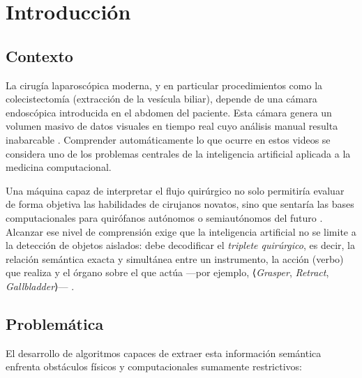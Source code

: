\documentclass[11pt]{article}
\begin{document}
\section{Introducción}
\label{sec:intro}

\subsection{Contexto}
\label{sec:contexto}

La cirugía laparoscópica moderna, y en particular procedimientos como la colecistectomía (extracción de la vesícula biliar), depende de una cámara endoscópica introducida en el abdomen del paciente. Esta cámara genera un volumen masivo de datos visuales en tiempo real cuyo análisis manual resulta inabarcable \cite{dergachyova2016}. Comprender automáticamente lo que ocurre en estos videos se considera uno de los problemas centrales de la inteligencia artificial aplicada a la medicina computacional.

Una máquina capaz de interpretar el flujo quirúrgico no solo permitiría evaluar de forma objetiva las habilidades de cirujanos novatos, sino que sentaría las bases computacionales para quirófanos autónomos o semiautónomos del futuro \cite{twinanda2017}. Alcanzar ese nivel de comprensión exige que la inteligencia artificial no se limite a la detección de objetos aislados: debe decodificar el \emph{triplete quirúrgico}, es decir, la relación semántica exacta y simultánea entre un instrumento, la acción (verbo) que realiza y el órgano sobre el que actúa —por ejemplo, ⟨\emph{Grasper}, \emph{Retract}, \emph{Gallbladder}⟩— \cite{nwoye2022rendezvous}.

\subsection{Problemática}
\label{sec:problematica}

El desarrollo de algoritmos capaces de extraer esta información semántica enfrenta obstáculos físicos y computacionales sumamente restrictivos:
\end{document}
